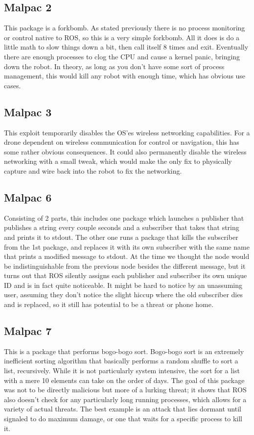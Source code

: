 \documentclass[IEEEtran,letterpaper,10pt,notitlepage,draftclsnofoot,onecolumn]{article}
\begin{document}
\subsection{Malpac 2}
This package is a forkbomb.
As stated previously there is no process monitoring or control native to ROS, so this is a very simple forkbomb. All it does is do a little math to slow things down a bit, then call itself 8 times and exit.
Eventually there are enough processes to clog the CPU and cause a kernel panic, bringing down the robot.
In theory, as long as you don’t have some sort of process management, this would kill any robot with enough time, which has obvious use cases.

\subsection{Malpac 3}
This exploit temporarily disables the OS’es wireless networking capabilities.
For a drone dependent on wireless communication for control or navigation, this has some rather obvious consequences.
It could also permanently disable the wireless networking with a small tweak, which would make the only fix to physically capture and wire back into the robot to fix the networking.

\subsection{Malpac 6}
Consisting of 2 parts, this includes one package which launches a publisher that publishes a string every couple seconds and a subscriber that takes that string and prints it to stdout.
The other one runs a package that kills the subscriber from the 1st package, and replaces it with its own subscriber with the same name that prints a modified message to stdout.
At the time we thought the node would be indistinguishable from the previous node besides the different message, but it turns out that ROS silently assigns each publisher and subscriber its own unique ID and is in fact quite noticeable.
It might be hard to notice by an unassuming user, assuming they don’t notice the slight hiccup where the old subscriber dies and is replaced, so it still has potential to be a threat or phone home.

\subsection{Malpac 7}
This is a package that performs bogo-bogo sort. \cite{bogo}
Bogo-bogo sort is an extremely inefficient sorting algorithm that basically performs a random shuffle to sort a list, recursively.
While it is not particularly system intensive, the sort for a list with a mere 10 elements can take on the order of days.
The goal of this package was not to be directly malicious but more of a lurking threat; it shows that ROS also doesn’t check for any particularly long running processes, which allows for a variety of actual threats.
The best example is an attack that lies dormant until signaled to do maximum damage, or one that waits for a specific process to kill it.
\end{document}

